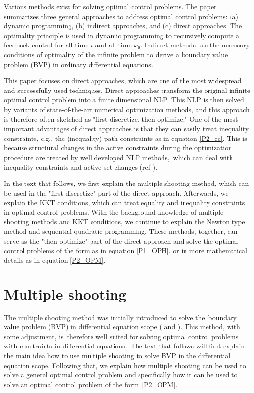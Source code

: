 \documentclass  [
  paper    = a4,
  BCOR     = 10mm,
  twoside,
  fontsize = 12pt,
  fleqn,
  toc      = bibnumbered,
  toc      = listofnumbered,
  numbers  = noendperiod,
  headings = normal,
  listof   = leveldown,
  version  = 3.03
]                                       {scrreprt}
\newcommand{\<}{\langle}
\renewcommand{\>}{\rangle}
\begin{document}
Various methods exist for solving optimal control problems. The paper \cite{MHHP05} summarizes three general approaches to address optimal control problems: (a) dynamic programming, (b) indirect approaches, and (c) direct approaches. The optimality principle is used in dynamic programming to recursively compute a feedback control for all time $t$ and all time $x_0$. Indirect methods use the necessary conditions of optimality of the infinite problem to derive a boundary value problem (BVP) in ordinary differential equations.


This paper focuses on direct approaches, which are one of the most widespread and successfully used techniques. Direct approaches transform the original infinite optimal control problem into a finite dimensional NLP. This NLP is then solved by variants of state-of-the-art numerical optimization methods, and this approach is therefore often sketched as "first discretize, then optimize." One of the most important advantages of direct approaches is that they can easily treat inequality constraints, e.g., the (inequality) path constraints as in equation \ref{P2_ec}. This is because structural changes in the active constraints during the optimization procedure are treated by well developed NLP methods, which can deal with inequality constraints and active set changes (ref \cite{MHHP05}).

In the text that follows, we first explain the multiple shooting method, which can be used in the "first discretize" part of the direct approach. Afterwards, we explain the KKT conditions, which can treat equality and inequality constraints in optimal control problems. With the background knowledge of multiple shooting methods and KKT conditions, we continue to explain the Newton type method and sequential quadratic programming. These methods, together, can serve as the "then optimize" part of the direct approach and solve the optimal control problems of the form as in equation \ref{P1_OPH}, or in more mathematical details as in equation \ref{P2_OPM}.


\section{Multiple shooting}
The multiple shooting method was initially introduced to solve the boundary value problem (BVP) in differential equation scope (\cite{DJJ62} and \cite{Michael69}). This method, with some adjustment, is therefore well suited for solving optimal control problems with constraints in differential equations. The text that follows will first explain the main idea how to use multiple shooting to solve BVP in the differential equation scope. Following that, we explain how multiple shooting can be used to solve a general optimal control problem and specifically how it can be used to solve an optimal control problem of the form \ref{P2_OPM}. 
\end{document}
